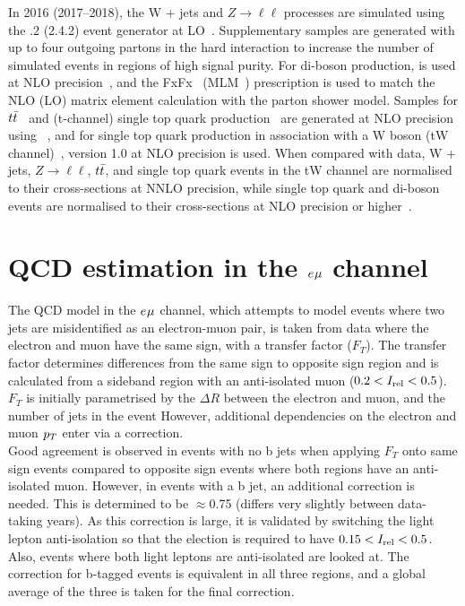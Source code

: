 In 2016 (2017--2018), the W + jets and $Z\rightarrow \ell\ell$ processes are simulated using the .2 (2.4.2) event generator at \ac{LO}~\cite{Alwall:2011uj}. 
Supplementary samples are generated with up to four outgoing partons in the hard interaction to increase the number of simulated events in regions of high signal purity. 
For di-boson production, \MGvATNLO is used at \ac{NLO} precision~\cite{Alwall:2011uj}, and the FxFx~\cite{Frederix:2012ps} (MLM~\cite{Alwall:2007fs}) prescription is used to match the \ac{NLO} (\ac{LO}) matrix element calculation with the parton shower model. 
Samples for $t\bar{t}$~\cite{Alioli:2011as} and (t-channel) single top quark production~\cite{Frederix:2012dh} are generated at \ac{NLO} precision using ~\cite{Nason:2004rx,Frixione:2007vw,Alioli:2010xd,Jezo:2015aia}, and for single top quark production in association with a W boson (tW channel)~\cite{Re:2010bp}, \POWHEG version 1.0 at \ac{NLO} precision is used. 
When compared with data, W + jets, $Z\rightarrow \ell\ell$, $t\bar{t}$, and single top quark events in the tW channel are normalised to their cross-sections at \ac{NNLO} precision\cite{Melnikov:2006kv,Czakon:2011xx,Kidonakis:2013zqa}, while single top quark and di-boson events are normalised to their cross-sections at \ac{NLO} precision or higher~\cite{Kidonakis:2013zqa,Campbell:2011bn,Gehrmann:2014fva}.

\section{QCD estimation in the $e_{}\mu_{}$ channel}
\label{sec:qcd}

The \ac{QCD} model in the $e_{}\mu_{}$ channel, which attempts to model events where two jets are misidentified as an electron-muon pair, is taken from data where the electron and muon have the same sign, with a transfer factor ($F_{T}$).
The transfer factor determines differences from the same sign to opposite sign region and is calculated from a sideband region with an anti-isolated muon ($0.2 < I_{\text{rel}} < 0.5$).
$F_{T}$ is initially parametrised by the $\Delta R$ between the electron and muon, and the number of jets in the event 
However, additional dependencies on the electron and muon $p_{T}$ enter via a correction. \\

Good agreement is observed in events with no b jets when applying $F_{T}$ onto same sign events compared to opposite sign events where both regions have an anti-isolated muon. 
However, in events with a b jet, an additional correction is needed.
This is determined to be $\approx$0.75 (differs very slightly between data-taking years).
As this correction is large, it is validated by switching the light lepton anti-isolation so that the election is required to have $0.15 < I_{\text{rel}} < 0.5$.
Also, events where both light leptons are anti-isolated are looked at.
The correction for b-tagged events is equivalent in all three regions, and a global average of the three is taken for the final correction. \\

